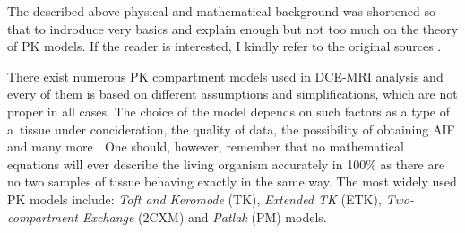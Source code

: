 The described above physical and mathematical background was shortened so that to indroduce very basics and explain enough but not too much on the theory of PK models. If the reader is interested, I kindly refer to the original sources \cite{sourbron2011scope, thesis}. 

There exist numerous PK compartment models used in DCE-MRI analysis and every of them is based on different assumptions and simplifications, which are not proper in all cases. The choice of the model depends on such factors as a type of a~tissue under concideration, the quality of data, the possibility of obtaining AIF and many more \cite{khalifa2014models}. One should, however, remember that no mathematical equations will ever describe the living organism accurately in 100\% as there are no two samples of tissue behaving exactly in the same way. The most widely used PK models include: \textit{Toft and Keromode} (TK), \textit{Extended TK} (ETK), \textit{Two-compartment Exchange} (2CXM) and \textit{Patlak} (PM) models.  

